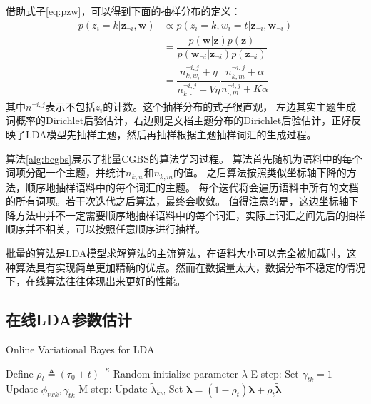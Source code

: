 借助式子\ref{eq:pzw}，可以得到下面的抽样分布的定义：
\begin{equation}
\begin{aligned}
p( z_i = k | \mathbf{z}_{\neg i},  \mathbf{w}) 
&\propto p( z_i = k , w_i = t | \mathbf{z}_{\neg i}, \mathbf{w}_{\neg i}) \\
& = \dfrac{p(\mathbf{w |z}) p(\mathbf{z})}{p(\mathbf{w}_{\neg i} | \mathbf{z}_{\neg i})p(\mathbf{z}_{\neg i})} \\
& = \dfrac{ n_{k, w_i}^{\neg i,j} + \eta }{ n_{k, \cdot}^{\neg i,j} + V\eta}
\dfrac{n_{k, m}^{\neg i,j} + \alpha}{n_{\cdot, m}^{\neg i,j} + K \alpha}
\end{aligned} 
\end{equation}
其中$n^{\neg i,j}$表示不包括$z_i$的计数。这个抽样分布的式子很直观，
左边其实主题生成词概率的Dirichlet后验估计，右边则是文档主题分布的Dirichlet后验估计，正好反映了LDA模型先抽样主题，然后再抽样根据主题抽样词汇的生成过程。

算法\ref{alg:bcgbs}展示了批量CGBS的算法学习过程。
算法首先随机为语料中的每个词项分配一个主题，并统计$n_{k, w}$和$n_{k, m}$的值。
之后算法按照类似坐标轴下降的方法，顺序地抽样语料中的每个词汇的主题。
每个迭代将会遍历语料中所有的文档的所有词项。若干次迭代之后算法，最终会收敛。
值得注意的是，这边坐标轴下降方法中并不一定需要顺序地抽样语料中的每个词汇，实际上词汇之间先后的抽样顺序并不相关，可以按照任意顺序进行抽样。

批量的算法是LDA模型求解算法的主流算法，在语料大小可以完全被加载时，这种算法具有实现简单更加精确的优点。然而在数据量太大，数据分布不稳定的情况下，在线算法往往体现出来更好的性能。

\subsection{在线LDA参数估计}
\begin{algorithm}[htb]
\caption{Online Variational Bayes for LDA} 
\label{alg:olda}
\begin{algorithmic}[1] 
\State Define $\rho_t \triangleq (\tau_0 + t)^{-\kappa}$
\State Random initialize parameter $\lambda$
\State E step:
\State Set $\gamma_{tk} = 1$
\Repeat
\State Update $\phi_{twk}, \gamma_{tk} $
\State M step:
\State Update $\tilde{\lambda}_{kw}$
\State Set $\mathbf{\lambda}=(1- \rho_t) \mathbf{\lambda} + \rho_t \tilde{\mathbf{\lambda}}$
\EndFor
\end{algorithmic}  
\end{algorithm}  

